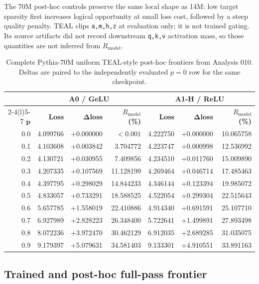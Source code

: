 \documentclass[10pt,a4paper]{article}
\newcommand{\Rmodel}{\ensuremath{R_{\mathrm{model}}}}
\newcommand{\code}[1]{\texttt{#1}}
\begin{document}
The 70M post-hoc controls preserve the same local shape as 14M: low target sparsity first increases logical opportunity at small loss cost, followed by a steep quality penalty. TEAL clips \code{a,m,h,z} at evaluation only; it is not trained gating. Its source artifacts did not record downstream \code{q,k,v} activation mass, so those quantities are not inferred from \Rmodel{}.

{\small
\begin{table}[htbp]
\centering
\caption{Complete Pythia-70M uniform TEAL-style post-hoc frontiers from Analysis 010. Deltas are paired to the independently evaluated $p=0$ row for the same checkpoint.}
\label{tab:teal-controls-70m}
\setlength{\tabcolsep}{3.2pt}
\begin{tabular*}{\textwidth}{@{\extracolsep{\fill}}r*{6}{r}@{}}
\toprule
& \multicolumn{3}{c}{\textbf{A0 / GeLU}} & \multicolumn{3}{c}{\textbf{A1-H / ReLU}} \\
\cmidrule(lr){2-4}\cmidrule(l){5-7}
$\boldsymbol{p}$ & \textbf{Loss} & $\boldsymbol{\Delta}$\textbf{loss} & \textbf{\Rmodel{} (\%)} & \textbf{Loss} & $\boldsymbol{\Delta}$\textbf{loss} & \textbf{\Rmodel{} (\%)} \\
\midrule
0.0 & 4.099766 & +0.000000 & $<0.001$ & 4.222750 & +0.000000 & 10.065758 \\
0.1 & 4.103608 & +0.003842 & 3.704772 & 4.223747 & +0.000998 & 12.536992 \\
0.2 & 4.130721 & +0.030955 & 7.409856 & 4.234510 & +0.011760 & 15.009890 \\
0.3 & 4.207335 & +0.107569 & 11.128199 & 4.269464 & +0.046714 & 17.485463 \\
0.4 & 4.397795 & +0.298029 & 14.844233 & 4.346144 & +0.123394 & 19.985072 \\
0.5 & 4.833057 & +0.733291 & 18.588525 & 4.522054 & +0.299304 & 22.515643 \\
0.6 & 5.657785 & +1.558019 & 22.410886 & 4.914340 & +0.691591 & 25.107710 \\
0.7 & 6.927989 & +2.828223 & 26.348400 & 5.722641 & +1.499891 & 27.893498 \\
0.8 & 8.072236 & +3.972470 & 30.462129 & 6.912035 & +2.689285 & 31.035075 \\
0.9 & 9.179397 & +5.079631 & 34.581403 & 9.133301 & +4.910551 & 33.891163 \\
\bottomrule
\end{tabular*}
\end{table}}
\FloatBarrier

\clearpage
\subsection{Trained and post-hoc full-pass frontier}
\end{document}
